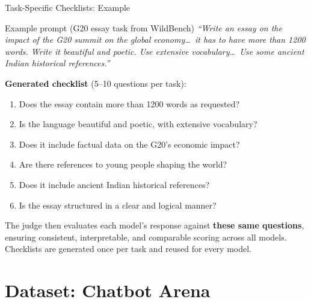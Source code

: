 \documentclass[aspectratio=169,11pt]{beamer}
\begin{document}
\begin{frame}{Task-Specific Checklists: Example}

\begin{block}{Example prompt (G20 essay task from WildBench)}
{\small\itshape ``Write an essay on the impact of the G20 summit on the global economy\ldots\ it has to have more than 1200 words. Write it beautiful and poetic. Use extensive vocabulary\ldots\ Use some ancient Indian historical references.''}
\end{block}

\vspace{0.3em}
\textbf{Generated checklist} (5--10 questions per task):
\begin{enumerate}\small
    \item Does the essay contain more than 1200 words as requested?
    \item Is the language beautiful and poetic, with extensive vocabulary?
    \item Does it include factual data on the G20's economic impact?
    \item Are there references to young people shaping the world?
    \item Does it include ancient Indian historical references?
    \item Is the essay structured in a clear and logical manner?
\end{enumerate}

\vspace{0.3em}
{\small The judge then evaluates each model's response against \textbf{these same questions}, ensuring consistent, interpretable, and comparable scoring across all models. Checklists are generated once per task and reused for every model.}
\end{frame}

\section{Dataset: Chatbot Arena}
\end{document}
